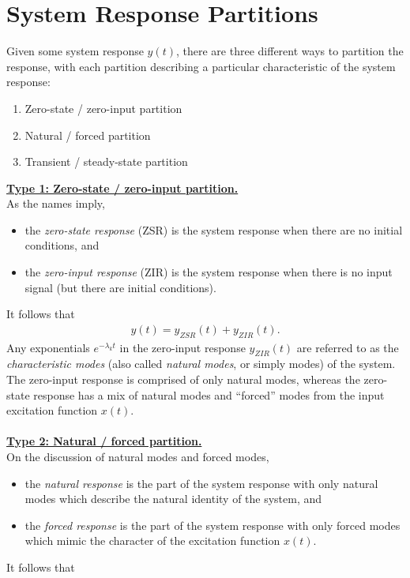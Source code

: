 \documentclass{report}
\begin{document}
\section{System Response Partitions}
Given some system response $y(t)$, there are three different ways to partition the response, with each partition describing a particular 
characteristic of the system response:
\begin{enumerate}
    \item Zero-state / zero-input partition
    \item Natural / forced partition
    \item Transient / steady-state partition
\end{enumerate}
\textbf{\underline{Type 1: Zero-state / zero-input partition.}} \\[0.25cm]
As the names imply,
\begin{itemize}
    \item the \emph{zero-state response} (ZSR) is the system response when there are no initial conditions, and
    \item the \emph{zero-input response} (ZIR) is the system response when there is no input signal (but there are initial conditions).
\end{itemize}
It follows that 
\begin{align}
    y(t) = y_{ZSR}(t) + y_{ZIR}(t).
\end{align}
Any exponentials $e^{-\lambda_k t}$ in the zero-input response $y_{ZIR}(t)$ are referred to as the \emph{characteristic modes} (also called \emph{natural modes}, or simply modes) 
of the system. The zero-input response is comprised of only natural modes, whereas the zero-state response has a mix of natural modes and ``forced'' modes from the input excitation function $x(t)$.
\\ \\ \noindent
\textbf{\underline{Type 2: Natural / forced partition.}} \\[0.25cm]
On the discussion of natural modes and forced modes,
\begin{itemize}
    \item the \emph{natural response} is the part of the system response with only natural modes which describe the natural identity of the system, and
    \item the \emph{forced response} is the part of the system response with only forced modes which mimic the character of the excitation function $x(t)$.
\end{itemize}
It follows that 
\end{document}
